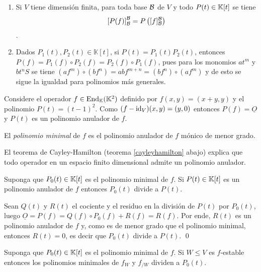   \begin{obs}
    \begin{enumerate}
      \item Si $V$ tiene dimensión finita, para toda base $\mathcal{B}$ de $V$ y todo $P(t)\in\mathbb{K}[t]$ se tiene
      $$\left[P(f)\right]_{\mathcal{B}}^{\mathcal{B}}=P\left([f]_{\mathcal{B}}^{\mathcal{B}}\right)$$.
      \item Dados $P_1(t),P_2(t)\in \mathbb{K}[t]$, si $P(t)=P_1(t)P_2(t)$, entonces $P(f)=P_1(f)\circ P_2(f)=P_2(f)\circ P_1(f)$, pues para los monomios $at^m$ y $bt^nS$ se tiene $\left(af^m\right)\circ\left( bf^n\right)=abf^{m+n}=\left( bf^n\right)\circ \left(af^m\right)$ y de esto se sigue la igualdad para polinomios más generales.
    \end{enumerate}
  \end{obs}

  \begin{ejem}
    Considere el operador $f\in\operatorname{End}_{\mathbb{K}}(\mathbb{K}^2)$ definido por $f(x,y)=(x+y,y)$ y el polinomio $P(t)=(t-1)^2$. Como $(f-\operatorname{id}_V)(x,y)=(y,0)$ entonces $P(f)=\underline{O}$ y $P(t)$ es un polinomio anulador de $f$.
  \end{ejem}

  \begin{defn}
    El \emph{polinomio minimal} de $f$ es el polinomio anulador de $f$ mónico de menor grado.
  \end{defn}

  \begin{obs}
    El teorema de Cayley-Hamilton (teorema \ref{cayleyhamilton} abajo) explica que todo operador en un espacio finito dimensional admite un polinomio anulador.
  \end{obs}

  \begin{prop}
    Suponga que $P_0(t)\in\mathbb{K}[t]$ es el polinomio minimal de $f$. Si $P(t)\in\mathbb{K}[t]$ es un polinomio anulador de $f$ entonces $P_0(t)$ divide a $P(t)$.
  \end{prop}

  \dem Sean $Q(t)$ y $R(t)$ el cociente y el residuo en la división de $P(t)$ por $P_0(t)$, luego $\underline{O}=P(f)=Q(f)\circ P_0(f)+R(f)=R(f)$. Por ende, $R(t)$ es un polinomio anulador de $f$ y, como es de menor grado que el polinomio minimal, entonces $R(t)=0$, es decir que $P_0(t)$ divide a $P(t)$. \qed

  \begin{prop}\label{polinomio_minimal_estable_y_cociente}
    Suponga que $P_0(t)\in\mathbb{K}[t]$ es el polinomio minimal de $f$. Si $W\le V$ es $f$-estable entonces los polinomios minimales de $f_W$ y $f_{/W}$ dividen a $P_0(t)$. 
  \end{prop}

